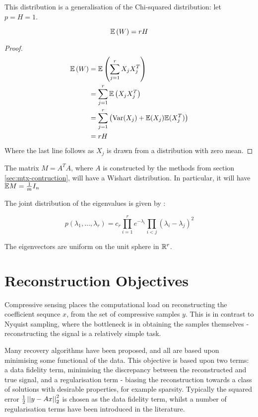 \begin{remark}
This distribution is a generalisation of the Chi-squared distribution: let \(p = H = 1\). 
\end{remark}

\begin{theorem}
\begin{equation}
{\mathbb{E}}\left(W\right) = rH
\end{equation}
\end{theorem}
\begin{proof}
\begin{align*}
{\mathbb{E}}\left(W\right) &= {\mathbb{E}}\left(\sum_{j=1}^r X_j X_j^T\right) \\
&= \sum_{j=1}^r {\mathbb{E}}\left(X_jX_j^T\right) \\
&= \sum_{j=1}^r \left( \mathrm{Var}(X_j) + {\mathbb{E}}(X_j) {\mathbb{E}}(X_j^T)   \right) \\
&= rH 
\end{align*}
Where the last line follows as \(X_j\) is drawn from a distribution with zero mean.
\end{proof}

\begin{remark}
The matrix \(M = A^TA\), where \(A\) is constructed by the methods from section \ref{sec:mtx-contruction}, will have a Wishart distribution. In particular, it will have \({\mathbb{E}} M = \frac{1}{m}I_n\) 
\label{remark: exp AtA}
\end{remark}

The joint distribution of the eigenvalues is given by \cite{levequeMatrices}:

\begin{equation}
p\left(\lambda_1, \ldots, \lambda_r\right) = c_r \prod_{i=1}^r e^{-\lambda_i}\prod_{i<j}\left(\lambda_i - \lambda_j\right)^2
\end{equation}

The eigenvectors are uniform on the unit sphere in \({\mathbb{R}}^{r}\).

\section{Reconstruction Objectives}
Compressive sensing places the computational load on reconstructing the coefficient sequnce \(x\), from the set of compressive samples \(y\). This is in contrast to Nyquist sampling, where the bottleneck is in obtaining the samples themselves - reconstructing the signal is a relatively simple task. 

Many recovery algorithms have been proposed, and all are based upon minimising some functional of the data. This objective is based upon two terms: a data fidelity term, minimising the discrepancy between the reconstructed and true signal, and a regularisation term - biasing the reconstruction towards a class of solutions with desirable properties, for example sparsity. Typically the squared error \( \frac{1}{2}\left|\left|y-Ax\right|\right|_2^2 \) is chosen as the data fidelity term, whilst a number of regularisation terms have been introduced in the literature. 


